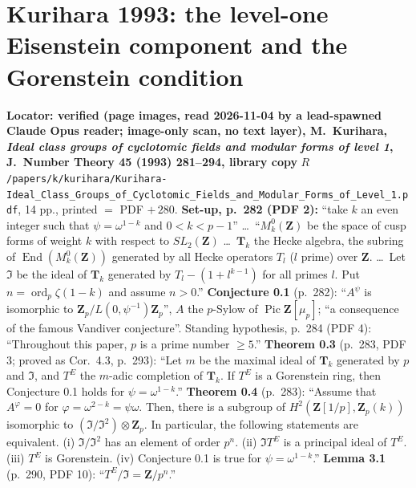 \section{Kurihara 1993: the level-one Eisenstein component and the Gorenstein condition}

\begin{hypothesis}\label{lit:hz-kurihara-gor}
  \textbf{Locator: verified (page images, read 2026-11-04 by a lead-spawned Claude Opus reader; image-only scan, no text layer), M.~Kurihara,
  \emph{Ideal class groups of cyclotomic fields and modular forms of level 1}, J.~Number Theory 45 (1993) 281--294, library copy}
  $R$\texttt{/papers/k/kurihara/Kurihara-Ideal\_Class\_Groups\_of\_Cyclotomic\_Fields\_and\_Modular\_Forms\_of\_Level\_1.pdf}, 14 pp.,
  printed $=$ PDF $+\,280$.
  \textbf{Set-up, p.~282 (PDF 2):} ``take $k$ an even integer such that $\psi=\omega^{1-k}$ and $0<k<p-1$'' \dots\ ``$M^0_k(\mathbf Z)$ be the space of
  cusp forms of weight $k$ with respect to $SL_2(\mathbf Z)$ \dots\ $\mathbf T_k$ the Hecke algebra, the subring of $\operatorname{End}(M^0_k(\mathbf Z))$
  generated by all Hecke operators $T_l$ ($l$ prime) over $\mathbf Z$. \dots\ Let $\mathfrak I$ be the ideal of $\mathbf T_k$ generated by
  $T_l-(1+l^{k-1})$ for all primes $l$. Put $n=\operatorname{ord}_p\zeta(1-k)$ and assume $n>0$.'' \textbf{Conjecture 0.1} (p.~282): ``$A^\psi$ is
  isomorphic to $\mathbf Z_p/L(0,\psi^{-1})\mathbf Z_p$'', $A$ the $p$-Sylow of $\operatorname{Pic}\mathbf Z[\mu_p]$; ``a consequence of the famous Vandiver
  conjecture''. Standing hypothesis, p.~284 (PDF 4): ``Throughout this paper, $p$ is a prime number $\ge5$.''
  \textbf{Theorem 0.3} (p.~283, PDF 3; proved as Cor.~4.3, p.~293): ``Let $m$ be the maximal ideal of $\mathbf T_k$ generated by $p$ and $\mathfrak I$,
  and $T^E$ the $m$-adic completion of $\mathbf T_k$. If $T^E$ is a Gorenstein ring, then Conjecture 0.1 holds for $\psi=\omega^{1-k}$.''
  \textbf{Theorem 0.4} (p.~283): ``Assume that $A^\varphi=0$ for $\varphi=\omega^{2-k}=\psi\omega$. Then, there is a subgroup of
  $H^2(\mathbf Z[1/p],\mathbf Z_p(k))$ isomorphic to $(\mathfrak I/\mathfrak I^2)\otimes\mathbf Z_p$. In particular, the following statements are
  equivalent. (i) $\mathfrak I/\mathfrak I^2$ has an element of order $p^n$. (ii) $\mathfrak IT^E$ is a principal ideal of $T^E$. (iii) $T^E$ is
  Gorenstein. (iv) Conjecture 0.1 is true for $\psi=\omega^{1-k}$.'' \textbf{Lemma 3.1} (p.~290, PDF 10): ``$T^E/\mathfrak I=\mathbf Z/p^n$.''

\end{hypothesis}
